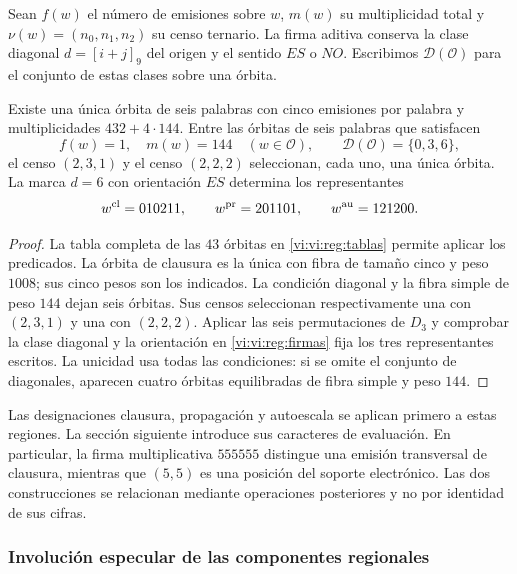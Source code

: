 Sean \(f(w)\) el número de emisiones sobre \(w\), \(m(w)\)
su multiplicidad total y \(\nu(w)=(n_0,n_1,n_2)\) su censo
ternario. La firma aditiva conserva la clase diagonal
\(d=[i+j]_9\) del origen y el sentido \(ES\) o \(NO\).
Escribimos \(\mathcal D(\mathcal O)\) para el conjunto de estas
clases sobre una órbita.

\begin{proposition}
\label{vi:vi:reg:seleccion}
Existe una única órbita de seis palabras con cinco emisiones por
palabra y multiplicidades \(432+4\cdot144\). Entre las órbitas
de seis palabras que satisfacen
\[
 f(w)=1,\quad m(w)=144\quad(w\in\mathcal O),\qquad
 \mathcal D(\mathcal O)=\{0,3,6\},
\]
el censo \((2,3,1)\) y el censo \((2,2,2)\) seleccionan,
cada uno, una única órbita. La marca \(d=6\) con orientación
\(ES\) determina los representantes
\[
 w^{\rm cl}=010211,\qquad w^{\rm pr}=201101,
 \qquad w^{\rm au}=121200.
\]
\end{proposition}
\begin{proof}
La tabla completa de las \(43\) órbitas en
\ref{vi:vi:reg:tablas} permite aplicar los predicados. La órbita de
clausura es la única con fibra de tamaño cinco y peso \(1008\);
sus cinco pesos son los indicados. La condición diagonal y la
fibra simple de peso \(144\) dejan seis órbitas. Sus censos
seleccionan respectivamente una con \((2,3,1)\) y una con
\((2,2,2)\). Aplicar las seis permutaciones de \(D_3\) y
comprobar la clase diagonal y la orientación en
\eqref{vi:vi:reg:firmas} fija los tres representantes escritos.
La unicidad usa todas las condiciones: si se omite el conjunto de
diagonales, aparecen cuatro órbitas equilibradas de fibra simple
y peso \(144\).
\end{proof}

Las designaciones clausura, propagación y autoescala se aplican
primero a estas regiones. La sección siguiente introduce sus
caracteres de evaluación. En particular, la firma multiplicativa
\(555555\) distingue una emisión transversal de clausura, mientras
que \((5,5)\) es una posición del soporte electrónico. Las dos
construcciones se relacionan mediante operaciones posteriores y no
por identidad de sus cifras.

\subsubsection{Involución especular de las componentes regionales}
\label{vi:mono-ampl:regiones}


